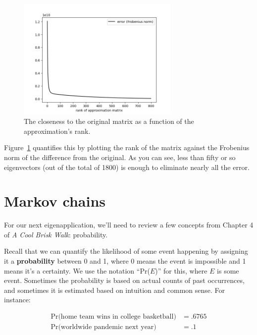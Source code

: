 \begin{alttitles}
\begin{figure}[H]
\centering
\includegraphics[width=0.7\textwidth]{frobenius.png}
\caption{The closeness to the original matrix as a function of the
approximation's rank.}
\label{fig:frobenius}
\end{figure}

Figure~\ref{fig:frobenius} quantifies this by plotting the rank of the matrix
against the Frobenius norm of the difference from the original. As you can see, 
less than fifty or so eigenvectors (out of the total of 1800) is enough to
eliminate nearly all the error.

\vfill
\pagebreak

\renewcommand{\thesubsection}{M\arabic{subsection}.}%
\section{Markov chains}


For our next eigenapplication, we'll need to review a few concepts from
Chapter 4 of \textit{A Cool Brisk Walk}: probability.

Recall that we can quantify the likelihood of some event happening by assigning
it a \textbf{probability} between 0 and 1, where 0 means the event is
impossible and 1 means it's a certainty. We use the notation ``Pr($E$)'' for
this, where $E$ is some event. Sometimes the probability is based on actual
counts of past occurrences, and sometimes it is estimated based on intuition
and common sense. For instance:

\vspace{-.15in}
\begin{align*}
\textrm{Pr(home team wins in college basketball)} &= .6765 \\
\textrm{Pr(worldwide pandemic next year)} &= .1
\end{align*}
\vspace{-.15in}


\end{alttitles}
